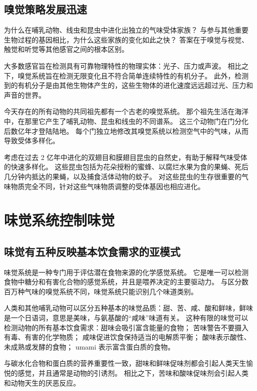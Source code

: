 \subsection{嗅觉策略发展迅速}

为什么在哺乳动物、线虫和昆虫中进化出独立的气味受体家族？
与参与其他重要生物过程的基因相比，为什么这些家族的变化如此之快？
答案在于嗅觉与视觉、触觉和听觉等其他感官之间的根本区别。


大多数感官旨在检测具有可靠物理特性的物理实体：光子、压力或声波。
相比之下，嗅觉系统旨在检测无限变化且不符合简单连续特性的有机分子。
此外，检测到的有机分子是由其他生物体产生的，这些生物体的进化速度远远超过光、压力和声音的世界。


今天存在的所有动物的共同祖先都有一个古老的嗅觉系统。
那个祖先生活在海洋中，在那里它产生了哺乳动物、昆虫和线虫的不同谱系。
这三个动物门在门分化后数亿年才登陆陆地。
每个门独立地修改其嗅觉系统以检测空气中的气味，从而导致受体多样化。


考虑在过去 2 亿年中进化的双翅目和膜翅目昆虫的自然史，有助于解释气味受体的快速多样化。
这些昆虫包括为花朵授粉的蜜蜂、以腐烂水果为食的果蝇、死后几分钟内抵达的果蝇，以及捕食活体动物的蚊子。
对这些昆虫的生存很重要的气味物质完全不同，针对这些气味物质调整的受体基因也相应进化。



\section{味觉系统控制味觉}

\subsection{味觉有五种反映基本饮食需求的亚模式}

味觉系统是一种专门用于评估潜在食物来源的化学感觉系统。
它是唯一可以检测食物中糖分和有害化合物的感觉系统，并且是喂养决定的主要驱动力。
与区分数百万种气味的嗅觉系统不同，味觉系统只能识别几个味道类别。


人类和其他哺乳动物可以区分五种基本的味觉品质：甜、苦、咸、酸和鲜味，鲜味是一个日语词，意思是美味，与氨基酸的“咸味”味道有关。
这种有限的味觉可以检测动物的所有基本饮食需求：甜味会吸引富含能量的食物；
苦味警告不要摄入有毒、有害的化学物质；
咸味促进饮食保持适当的电解质平衡；
酸味表示酸性、未成熟或发酵的食物；
umami 表示富含蛋白质的食物。


与碳水化合物和蛋白质的营养重要性一致，甜味和鲜味促味剂都会引起人类天生愉悦的感觉，并且通常是动物的引诱剂。
相比之下，苦味和酸味促味剂会引起人类和动物天生的厌恶反应。


